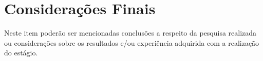 \chapter[Considerações Finais]{Considerações Finais}

Neste item poderão ser mencionadas conclusões a respeito da pesquisa realizada ou 
considerações sobre os resultados e/ou experiência adquirida com a realização do estágio.